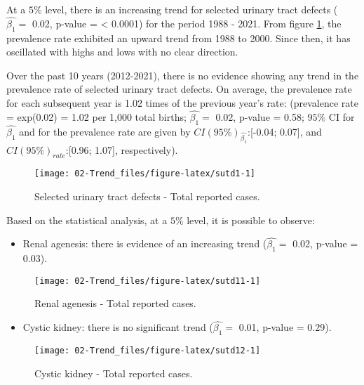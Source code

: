 \documentclass[
]{krantz}
\providecommand{\tightlist}{%
  \setlength{\itemsep}{0pt}\setlength{\parskip}{0pt}}
\begin{document}
At a \(5\%\) level, there is an increasing trend for selected urinary tract defects (\(\hat{\beta_{1}} =\) 0.02, p-value = \textless{} 0.0001) for the period 1988 - 2021. From figure \ref{fig:sutd1}, the prevalence rate exhibited an upward trend from 1988 to 2000. Since then, it has oscillated with highs and lows with no clear direction.

Over the past 10 years (2012-2021), there is no evidence showing any trend in the prevalence rate of selected urinary tract defects. On average, the prevalence rate for each subsequent year is 1.02 times of the previous year's rate: (prevalence rate = exp(0.02) = 1.02 per 1,000 total births; \(\hat{\beta_{1}} =\) 0.02, p-value = 0.58; \(95\%\) CI for \(\hat{\beta_{1}}\) and for the prevalence rate are given by \(CI(95\%)_{\hat{\beta_{1}}}\):{[}-0.04; 0.07{]}, and \(CI(95\%)_{rate}\):{[}0.96; 1.07{]}, respectively).

\begin{figure}[h]

{\centering \texttt{[image: 02-Trend\_files/figure-latex/sutd1-1]} 

}

\caption{Selected urinary tract defects - Total reported cases.}\label{fig:sutd1}
\end{figure}

Based on the statistical analysis, at a \(5\%\) level, it is possible to observe:

\begin{itemize}
\tightlist
\item
  Renal agenesis: there is evidence of an increasing trend (\(\hat{\beta_{1}} =\) 0.02, p-value = 0.03).
\end{itemize}

\begin{figure}[h]

{\centering \texttt{[image: 02-Trend\_files/figure-latex/sutd11-1]} 

}

\caption{Renal agenesis - Total reported cases.}\label{fig:sutd11}
\end{figure}

\begin{itemize}
\tightlist
\item
  Cystic kidney: there is no significant trend (\(\hat{\beta_{1}} =\) 0.01, p-value = 0.29).
\end{itemize}

\begin{figure}[h]

{\centering \texttt{[image: 02-Trend\_files/figure-latex/sutd12-1]} 

}

\caption{Cystic kidney - Total reported cases.}\label{fig:sutd12}
\end{figure}
\end{document}
